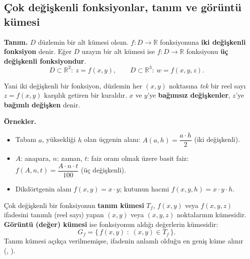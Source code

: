 \subsection{Çok değişkenli fonksiyonlar, tanım ve görüntü kümesi}

\begin{tahta}
\textbf{Tanım.} $D$ düzlemin bir alt kümesi olsun. $f:D\to\mathbb R$ fonksiyonuna \textbf{iki değişkenli fonksiyon} denir.
Eğer $D$ uzayın bir alt kümesi ise $f:D\to\mathbb R$ fonksiyonu \textbf{üç değişkenli fonksiyondur}.
\[
D\subset\mathbb R^2:\ z=f(x,y), \qquad D\subset\mathbb R^3:\ w=f(x,y,z).
\]
\end{tahta}

Yani iki değişkenli bir fonksiyon, düzlemin her $(x,y)$ noktasına \emph{tek} bir reel sayı $z=f(x,y)$ karşılık getiren
bir kuraldır. $x$ ve $y$'ye \textbf{bağımsız değişkenler}, $z$'ye \textbf{bağımlı değişken} denir.

\begin{tahta}
\textbf{Örnekler.}
\begin{itemize}
  \item Tabanı $a$, yüksekliği $h$ olan üçgenin alanı: $A(a,h)=\dfrac{a\cdot h}{2}$ \quad (iki değişkenli).
  \item $A$: anapara, $n$: zaman, $t$: faiz oranı olmak üzere basit faiz: $f(A,n,t)=\dfrac{A\cdot n\cdot t}{100}$
        \quad (üç değişkenli).
  \item Dikdörtgenin alanı $f(x,y)=x\cdot y$; kutunun hacmi $f(x,y,h)=x\cdot y\cdot h$.
\end{itemize}
\end{tahta}

\begin{tanim}
Çok değişkenli bir fonksiyonun \textbf{tanım kümesi} $T_f$, $f(x,y)$ veya $f(x,y,z)$ ifadesini tanımlı (reel sayı) yapan
$(x,y)$ veya $(x,y,z)$ noktalarının kümesidir. \textbf{Görüntü (değer) kümesi} ise fonksiyonun aldığı değerlerin kümesidir:
\[
G_f=\{\,f(x,y)\;:\;(x,y)\in T_f\,\}.
\]
Tanım kümesi açıkça verilmemişse, ifadenin anlamlı olduğu en geniş küme alınır (,
).
\end{tanim}

